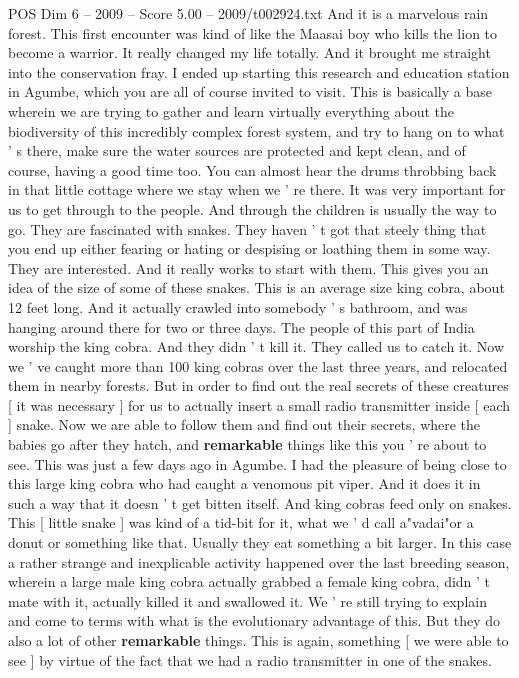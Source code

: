 \begin{textsample}{POS Dim 6 – 2009 – Score 5.00 – 2009/t002924.txt}
And it is a marvelous rain forest.
This first encounter was kind of like the Maasai boy who kills the lion to become a warrior.
It really changed my life totally.
And it brought me straight into the conservation fray.
I ended up starting this research and education station in Agumbe, which you are all of course invited to visit.
This is basically a base wherein we are trying to gather and learn virtually everything about the biodiversity of this incredibly complex forest system, and try to hang on to what ' s there, make sure the water sources are protected and kept clean, and of course, having a good time too.
You can almost hear the drums throbbing back in that little cottage where we stay when we ' re there.
It was very important for us to get through to the people.
And through the children is usually the way to go.
They are fascinated with snakes.
They haven ' t got that steely thing that you end up either fearing or hating or despising or loathing them in some way.
They are interested.
And it really works to start with them.
This gives you an idea of the size of some of these snakes.
This is an average size king cobra, about 12 feet long.
And it actually crawled into somebody ' s bathroom, and was hanging around there for two or three days.
The people of this part of India worship the king cobra.
And they didn ' t kill it.
They called us to catch it.
Now we ' ve caught more than 100 king cobras over the last three years, and relocated them in nearby forests.
But in order to find out the real secrets of these creatures [ it was necessary ] for us to actually insert a small radio transmitter inside [ each ] snake.
Now we are able to follow them and find out their secrets, where the babies go after they hatch, and \textbf{remarkable} things like this you ' re about to see.
This was just a few days ago in Agumbe.
I had the pleasure of being close to this large king cobra who had caught a venomous pit viper.
And it does it in such a way that it doesn ' t get bitten itself.
And king cobras feed only on snakes.
This [ little snake ] was kind of a tid-bit for it, what we ' d call a"vadai"or a donut or something like that.
Usually they eat something a bit larger.
In this case a rather strange and inexplicable activity happened over the last breeding season, wherein a large male king cobra actually grabbed a female king cobra, didn ' t mate with it, actually killed it and swallowed it.
We ' re still trying to explain and come to terms with what is the evolutionary advantage of this.
But they do also a lot of other \textbf{remarkable} things.
This is again, something [ we were able to see ] by virtue of the fact that we had a radio transmitter in one of the snakes.

\end{textsample}
